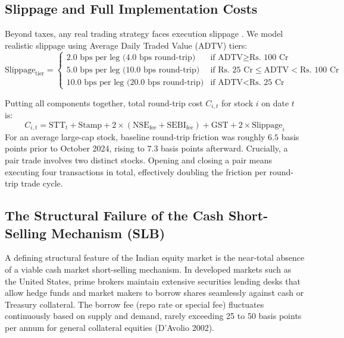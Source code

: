 \subsection{Slippage and Full Implementation Costs}
Beyond taxes, any real trading strategy faces execution slippage \citep{roll1984simple,lesmond1999new,amihud2002illiquidity,frazzini2018trading}. We model realistic slippage using Average Daily Traded Value (ADTV) tiers:
\begin{equation}
    \text{Slippage}_{\text{tier}} = \begin{cases}
        2.0 \text{ bps per leg (}4.0\text{ bps round-trip)} & \text{if ADTV} \ge \text{Rs.~100 Cr} \\
        5.0 \text{ bps per leg (}10.0\text{ bps round-trip)} & \text{if Rs.~25 Cr} \le \text{ADTV} < \text{Rs.~100 Cr} \\
        10.0 \text{ bps per leg (}20.0\text{ bps round-trip)} & \text{if ADTV} < \text{Rs.~25 Cr}
    \end{cases}
\end{equation}

Putting all components together, total round-trip cost $C_{i,t}$ for stock $i$ on date $t$ is:
\begin{equation}
    C_{i,t} = \text{STT}_t + \text{Stamp} + 2 \times (\text{NSE}_{\text{fee}} + \text{SEBI}_{\text{fee}}) + \text{GST} + 2 \times \text{Slippage}_i
\end{equation}
For an average large-cap stock, baseline round-trip friction was roughly $6.5$ basis points prior to October 2024, rising to $7.3$ basis points afterward. Crucially, a pair trade involves two distinct stocks. Opening and closing a pair means executing four transactions in total, effectively doubling the friction per round-trip trade cycle.


\subsection{The Structural Failure of the Cash Short-Selling Mechanism (SLB)}
A defining structural feature of the Indian equity market is the near-total absence of a viable cash market short-selling mechanism. In developed markets such as the United States, prime brokers maintain extensive securities lending desks that allow hedge funds and market makers to borrow shares seamlessly against cash or Treasury collateral. The borrow fee (repo rate or special fee) fluctuates continuously based on supply and demand, rarely exceeding 25 to 50 basis points per annum for general collateral equities (D'Avolio 2002).

